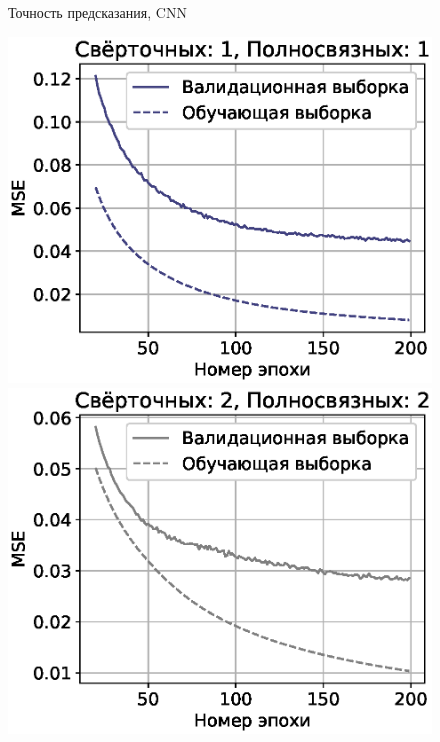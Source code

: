 \documentclass[12pt,twoside]{article}
\begin{document}
\begin{figure}[H]
    \centering
    \caption{Точность предсказания, CNN}
\end{figure}

\begin{figure}[H]
    \includegraphics[scale=0.44]{charts/cnn11_mse.eps}
    \includegraphics[scale=0.44]{charts/cnn22_mse.eps}

\end{figure}
\end{document}
